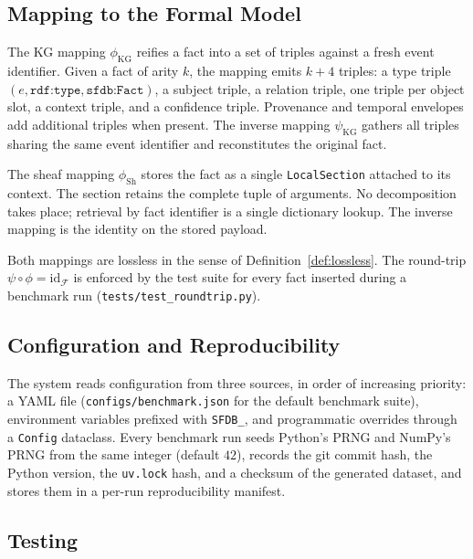 \subsection{Mapping to the Formal Model}
\label{sec:mapping:kg-real}
\label{sec:mapping:sh-real}

The KG mapping $\phi_{\mathrm{KG}}$ reifies a fact into a set of triples
against a fresh event identifier. Given a fact of arity $k$, the mapping
emits $k + 4$ triples: a type triple $(e, \texttt{rdf:type}, \texttt{sfdb:Fact})$,
a subject triple, a relation triple, one triple per object slot, a context
triple, and a confidence triple. Provenance and temporal envelopes add
additional triples when present. The inverse mapping $\psi_{\mathrm{KG}}$
gathers all triples sharing the same event identifier and reconstitutes
the original fact.

The sheaf mapping $\phi_{\mathrm{Sh}}$ stores the fact as a single
\texttt{LocalSection} attached to its context. The section retains the
complete tuple of arguments. No decomposition takes place; retrieval by
fact identifier is a single dictionary lookup. The inverse mapping is the
identity on the stored payload.

Both mappings are lossless in the sense of Definition~\ref{def:lossless}.
The round-trip $\psi \circ \phi = \mathrm{id}_\mathcal{F}$ is enforced by
the test suite for every fact inserted during a benchmark run
(\texttt{tests/test\_roundtrip.py}).

\subsection{Configuration and Reproducibility}
\label{sec:impl:config}

The system reads configuration from three sources, in order of increasing
priority: a YAML file (\texttt{configs/benchmark.json} for the default
benchmark suite), environment variables prefixed with \texttt{SFDB\_}, and
programmatic overrides through a \texttt{Config} dataclass. Every
benchmark run seeds Python's PRNG and NumPy's PRNG from the same integer
(default $42$), records the git commit hash, the Python version, the
\texttt{uv.lock} hash, and a checksum of the generated dataset, and stores
them in a per-run reproducibility manifest.

\subsection{Testing}
\label{sec:impl:testing}

